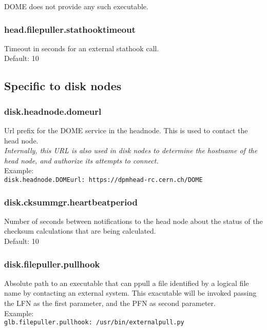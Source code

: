 \documentclass[a4paper,10pt]{scrreprt}
\begin{document}
DOME does not provide any such executable.\\

\subsubsection{head.filepuller.stathooktimeout}
Timeout in seconds for an external stathook call.\\
Default: 10\\

\subsection{Specific to disk nodes}

\subsubsection{disk.headnode.domeurl}
Url prefix for the DOME service in the headnode. This is used to contact the head node.\\

\textit{Internally, this URL is also used in disk nodes to determine the hostname of the head node, and authorize its attempts to connect.}\\

Example:\\
\lstinline"disk.headnode.DOMEurl: https://dpmhead-rc.cern.ch/DOME"\\

\subsubsection{disk.cksummgr.heartbeatperiod}
Number of seconds between notifications to the head node about the status of the checksum calculations that are being calculated.\\
Default: 10\\


\subsubsection{disk.filepuller.pullhook}

Absolute path to an executable that can ppull a file identified by a logical file name by contacting an external system. This exacutable
will be invoked passing the LFN as the first parameter, and the PFN as second parameter.\\

Example:\\
\lstinline"glb.filepuller.pullhook: /usr/bin/externalpull.py"\\
\end{document}

